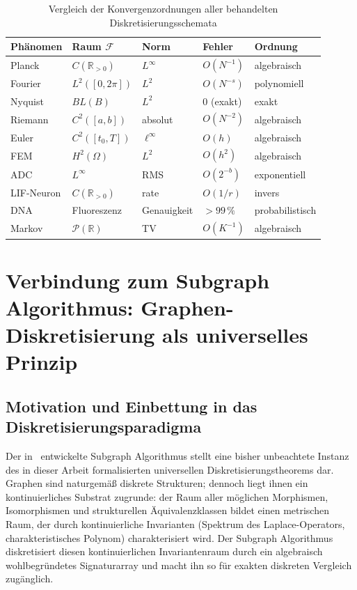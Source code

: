﻿\documentclass[a4paper,12pt]{article}
\theoremstyle{definition}
\begin{document}
\begin{table}[h]
\centering
\begin{tabular}{lllll}
\toprule
\textbf{Phänomen} & \textbf{Raum} $\mathcal{F}$ & \textbf{Norm} & \textbf{Fehler} & \textbf{Ordnung}\\
\midrule
Planck & $C(\mathbb{R}_{>0})$ & $L^\infty$ & $O(N^{-1})$ & algebraisch\\
Fourier & $L^2([0,2\pi])$ & $L^2$ & $O(N^{-s})$ & polynomiell\\
Nyquist & $BL(B)$ & $L^2$ & 0 (exakt) & exakt\\
Riemann & $C^2([a,b])$ & absolut & $O(N^{-2})$ & algebraisch\\
Euler & $C^2([t_0,T])$ & $\ell^\infty$ & $O(h)$ & algebraisch\\
FEM & $H^2(\Omega)$ & $L^2$ & $O(h^2)$ & algebraisch\\
ADC & $L^\infty$ & RMS & $O(2^{-b})$ & exponentiell\\
LIF-Neuron & $C(\mathbb{R}_{>0})$ & rate & $O(1/r)$ & invers\\
DNA & Fluoreszenz & Genauigkeit & $>99\,\%$ & probabilistisch\\
Markov & $\mathcal{P}(\mathbb{R})$ & TV & $O(K^{-1})$ & algebraisch\\
\bottomrule
\end{tabular}
\caption{Vergleich der Konvergenzordnungen aller behandelten Diskretisierungsschemata}
\end{table}

\section{Verbindung zum Subgraph Algorithmus: Graphen-Diskretisierung als universelles Prinzip}
\label{sec:subgraph}

\subsection{Motivation und Einbettung in das Diskretisierungsparadigma}

Der in~\cite{epp2026subgraph} entwickelte Subgraph Algorithmus stellt eine bisher unbeachtete
Instanz des in dieser Arbeit formalisierten universellen Diskretisierungstheorems dar.
Graphen sind naturgemäß diskrete Strukturen; dennoch liegt ihnen ein kontinuierliches Substrat
zugrunde: der Raum aller möglichen Morphismen, Isomorphismen und strukturellen
Äquivalenzklassen bildet einen metrischen Raum, der durch kontinuierliche Invarianten
(Spektrum des Laplace-Operators, charakteristisches Polynom) charakterisiert wird.
Der Subgraph Algorithmus diskretisiert diesen kontinuierlichen Invariantenraum durch ein
algebraisch wohlbegründetes Signaturarray und macht ihn so für exakten diskreten Vergleich
zugänglich.
\end{document}
